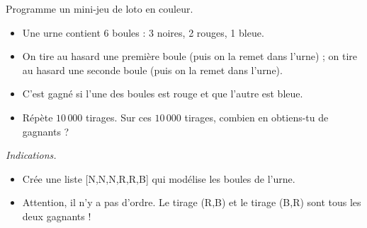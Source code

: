 \documentclass[class=report,crop=false, 12pt]{standalone}
\begin{document}
\begin{activite}

Programme un mini-jeu de loto en couleur.
\begin{itemize}
  \item Une urne contient $6$ boules : 3 noires, 2 rouges, 1 bleue.
  \item On tire au hasard une première boule (puis on la remet dans l'urne) ; on tire au hasard une seconde boule (puis on la remet dans l'urne).
  \item C'est gagné si l'une des boules est rouge et que l'autre est bleue.
  \item Répète $10\,000$ tirages. Sur ces $10\,000$ tirages, combien en obtiens-tu de gagnants ?
\end{itemize}

\bigskip

\emph{Indications.} 
\begin{itemize}
  \item Crée une liste [N,N,N,R,R,B] qui modélise les boules de l'urne. 
  \item Attention, il n'y a pas d'ordre. Le tirage (R,B) et le tirage (B,R) sont tous les deux gagnants !
\end{itemize}
  
\end{activite}
\end{document}
